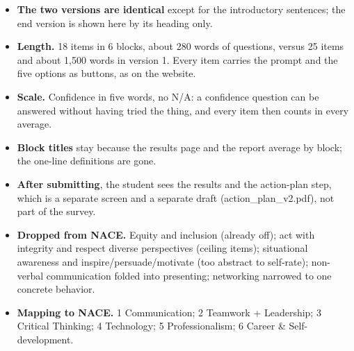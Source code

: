 \documentclass[11pt,letterpaper]{article}
\begin{document}
\begin{itemize}[leftmargin=1.5em]
\item \textbf{The two versions are identical} except for the introductory sentences; the end version is shown here by its heading only.
\item \textbf{Length.} 18 items in 6 blocks, about 280 words of questions, versus 25 items and about 1,500 words in version 1. Every item carries the prompt and the five options as buttons, as on the website.
\item \textbf{Scale.} Confidence in five words, no N/A: a confidence question can be answered without having tried the thing, and every item then counts in every average.
\item \textbf{Block titles} stay because the results page and the report average by block; the one-line definitions are gone.
\item \textbf{After submitting}, the student sees the results and the action-plan step, which is a separate screen and a separate draft (action\_plan\_v2.pdf), not part of the survey.
\item \textbf{Dropped from NACE.} Equity and inclusion (already off); act with integrity and respect diverse perspectives (ceiling items); situational awareness and inspire/persuade/motivate (too abstract to self-rate); non-verbal communication folded into presenting; networking narrowed to one concrete behavior.
\item \textbf{Mapping to NACE.} 1 Communication; 2 Teamwork + Leadership; 3 Critical Thinking; 4 Technology; 5 Professionalism; 6 Career \& Self-development.
\end{itemize}
\end{document}
